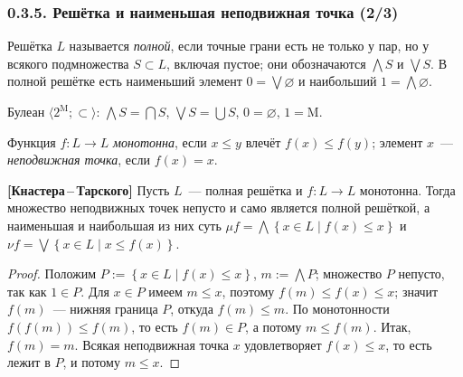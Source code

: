 \documentclass[mathserif,12pt,aspectratio=169]{beamer}
\def\emразделенной{\em разделенной}
\renewcommand{\index}[1]{}
\def\em#1{\it\color{blue}#1}
\def\NB#1{{\bf\color{brown}#1}}
\def\odmkey#1#2{{\it\color{red} #1}\index{#2}}
\let\emptyset\varnothing
\def\Set#1#2{\left\{ #1 \mid #2 \right\}}
\def\Assign{\operatorname{:=}}
\let\le\leqslant
\begin{document}
\begin{frame}
\frametitle{0.3.5. Решётка и наименьшая неподвижная точка (2/3)}

Решётка $L$ называется \odmkey{полной}{Решётка!полная}, если точные грани есть не
только у пар, но у всякого подмножества $S\subset L$, включая пустое; они
обозначаются $\bigwedge S$ и $\bigvee S$. В полной решётке есть наименьший
элемент $0=\bigvee\emptyset$ и наибольший $1=\bigwedge\emptyset$.

\begin{example}
Булеан $\langle 2^{\mathrm{M}};\subset\rangle$: $\bigwedge S=\bigcap S$,
$\bigvee S=\bigcup S$, $0=\emptyset$, $1=\mathrm{M}$.
\end{example}

Функция $f:L\to L$ {\em монотонна}, если $x\le y$ влечёт $f(x)\le f(y)$; элемент
$x$~--- \odmkey{неподвижная точка}{Точка!неподвижная}, если $f(x)=x$.

\begin{theorem} \NB{[Кнастера\,--\,Тарского]}
Пусть $L$~--- полная решётка и $f:L\to L$ монотонна. Тогда множество неподвижных
точек непусто и само является полной решёткой, а наименьшая и наибольшая из них
суть $\mu f=\bigwedge\Set{x\in L}{f(x)\le x}$ и
$\nu f=\bigvee\Set{x\in L}{x\le f(x)}$.
\end{theorem}

\begin{proof}
Положим $P\Assign\Set{x\in L}{f(x)\le x}$, $m\Assign\bigwedge P$; множество $P$
непусто, так как $1\in P$. Для $x\in P$ имеем $m\le x$, поэтому
$f(m)\le f(x)\le x$; значит $f(m)$~--- нижняя граница $P$, откуда $f(m)\le m$. По
монотонности $f(f(m))\le f(m)$, то есть $f(m)\in P$, а потому $m\le f(m)$. Итак,
$f(m)=m$. Всякая неподвижная точка $x$ удовлетворяет $f(x)\le x$, то есть лежит
в $P$, и потому $m\le x$.
\end{proof}
\end{frame}
\end{document}
